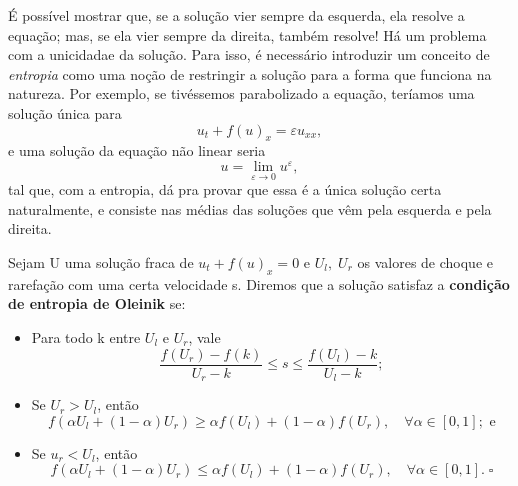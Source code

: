 \documentclass[../differential_methods.tex]{subfiles}
\begin{document}
É possível mostrar que, se a solução vier sempre da esquerda, ela resolve a equação; mas, se ela vier sempre da direita, também resolve! Há um problema com a unicidadae da solução. Para isso, é necessário introduzir um conceito de \textit{entropia} como uma noção de restringir a solução para a forma que funciona na natureza.
Por exemplo, se tivéssemos parabolizado a equação, teríamos uma solução única para
\[
	u_t + f(u)_x = \varepsilon u_{xx},
\]
e uma solução da equação não linear seria
\[
	u=\lim_{\varepsilon \to 0}u^{\varepsilon },
\]
tal que, com a entropia, dá pra provar que essa é a única solução certa naturalmente, e consiste nas médias das soluções que vêm pela esquerda e pela direita.
\begin{def*}
	Sejam U uma solução fraca de \(u_t + f(u)_x = 0\) e \(U_l,\; U_r\) os valores de choque e rarefação com uma certa velocidade s. Diremos que a solução satisfaz a \textbf{condição de entropia de Oleinik} se:
	\begin{itemize}
		\item[i)]Para todo k entre \(U_l\) e \(U_r\), vale
		      \[
			      \frac{f(U_r) - f(k)}{U_r - k} \leq s \leq \frac{f(U_l)-k}{U_l - k};
		      \]
		\item[ii)] Se \(U_r > U_l\), então
		      \[
			      f(\alpha U_l + (1-\alpha )U_r)\geq \alpha f(U_l)+(1-\alpha )f(U_r), \quad \forall \alpha \in [0,1]; \text{ e}
		      \]
		\item[iii)] Se \(u_r < U_l\), então
		      \[
			      f(\alpha U_l + (1-\alpha )U_r)\leq \alpha f(U_l)+(1-\alpha )f(U_r), \quad \forall \alpha \in [0,1]. \; \square
		      \]
	\end{itemize}
\end{def*}
\end{document}
